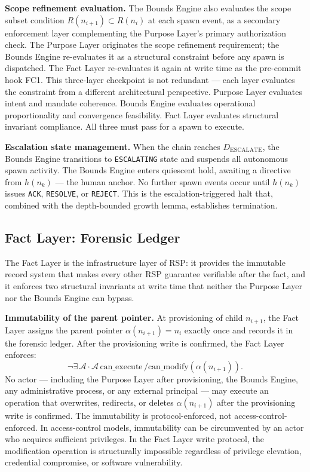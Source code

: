 \medskip
\noindent\textbf{Scope refinement evaluation.} The Bounds Engine also evaluates the scope subset condition $R(n_{i+1}) \subset R(n_i)$ at each spawn event, as a secondary enforcement layer complementing the Purpose Layer's primary authorization check. The Purpose Layer originates the scope refinement requirement; the Bounds Engine re-evaluates it as a structural constraint before any spawn is dispatched. The Fact Layer re-evaluates it again at write time as the pre-commit hook FC1. This three-layer checkpoint is not redundant — each layer evaluates the constraint from a different architectural perspective. Purpose Layer evaluates intent and mandate coherence. Bounds Engine evaluates operational proportionality and convergence feasibility. Fact Layer evaluates structural invariant compliance. All three must pass for a spawn to execute.

\medskip
\noindent\textbf{Escalation state management.} When the chain reaches $D_{\mathrm{ESCALATE}}$, the Bounds Engine transitions to \texttt{ESCALATING} state and suspends all autonomous spawn activity. The Bounds Engine enters quiescent hold, awaiting a directive from $h(n_k)$ — the human anchor. No further spawn events occur until $h(n_k)$ issues \texttt{ACK}, \texttt{RESOLVE}, or \texttt{REJECT}. This is the escalation-triggered halt that, combined with the depth-bounded growth lemma, establishes termination.

\subsection{Fact Layer: Forensic Ledger}
\label{sec:rs-fact-ledger}

The Fact Layer is the infrastructure layer of RSP: it provides the immutable record system that makes every other RSP guarantee verifiable after the fact, and it enforces two structural invariants at write time that neither the Purpose Layer nor the Bounds Engine can bypass.

\medskip
\noindent\textbf{Immutability of the parent pointer.} At provisioning of child $n_{i+1}$, the Fact Layer assigns the parent pointer $\alpha(n_{i+1}) = n_i$ exactly once and records it in the forensic ledger. After the provisioning write is confirmed, the Fact Layer enforces:
\begin{equation}
\neg \exists\, \mathcal{A} \cdot \mathcal{A}\,\text{can\_execute}\,/\text{can\_modify}(\alpha(n_{i+1})).
\label{eq:rs-pointer-immutability}
\end{equation}
No actor — including the Purpose Layer after provisioning, the Bounds Engine, any administrative process, or any external principal — may execute an operation that overwrites, redirects, or deletes $\alpha(n_{i+1})$ after the provisioning write is confirmed. The immutability is protocol-enforced, not access-control-enforced. In access-control models, immutability can be circumvented by an actor who acquires sufficient privileges. In the Fact Layer write protocol, the modification operation is structurally impossible regardless of privilege elevation, credential compromise, or software vulnerability.

